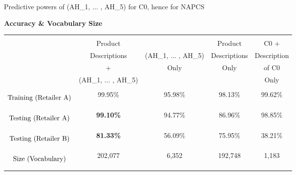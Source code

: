 

\begin{frame}{\small Predictive powers of (AH\_1, ... , AH\_5) for C0, hence for NAPCS}

{\scriptsize

\begin{center}
\vskip -0.3cm
\textbf{\small Accuracy \& Vocabulary Size}
\vskip 0.05cm
\begin{tabular}{|c|c|c|c|c|}
\hline
&&&&\\
& Product & & Product & C0 + \\
& Descriptions & ({\tiny AH\_1, ... , AH\_5}) & Descriptions & Description \\
& + & Only & Only & of C0 \\
& ({\tiny AH\_1, ... , AH\_5}) & & & Only \\
&&&&\\
\hline\hline
$\overset{{\color{white}-}}{\underset{{\color{white}-}}{\textnormal{Training (Retailer A)}}}$ &
	99.95\% & 95.98\% & 98.13\% & 99.62\% \\
\hline
$\overset{{\color{white}-}}{\underset{{\color{white}-}}{\textnormal{Testing (Retailer A)}}}$ &
	\textbf{\color{red}99.10\%} & 94.77\% & 86.96\% & 98.85\% \\
\hline
$\overset{{\color{white}-}}{\underset{{\color{white}-}}{\textnormal{Testing (Retailer B)}}}$ &
	\textbf{\color{red}81.33\%} & 56.09\% & 75.95\% & 38.21\% \\
\hline
$\overset{{\color{white}-}}{\underset{{\color{white}-}}{\textnormal{Size (Vocabulary)}}}$ &
  202,077 & 6,352 & 192,748 & 1,183 \\
\hline
\end{tabular}
\end{center}
}

\end{frame}
\normalsize

